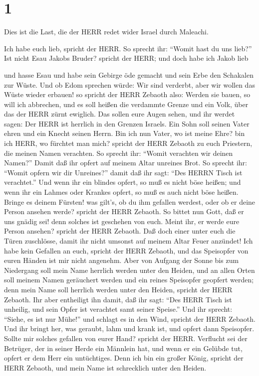 \hypertarget{section}{%
\section{1}\label{section}}

 Dies ist die Last, die der HERR redet wider Israel durch
Maleachi.

 Ich habe euch lieb, spricht der HERR. So sprecht ihr:
``Womit hast du uns lieb?'' Ist nicht Esau Jakobs Bruder? spricht der
HERR; und doch habe ich Jakob lieb

 und hasse Esau und habe sein Gebirge öde gemacht und sein
Erbe den Schakalen zur Wüste.  Und ob Edom sprechen würde:
Wir sind verderbt, aber wir wollen das Wüste wieder erbauen! so spricht
der HERR Zebaoth also: Werden sie bauen, so will ich abbrechen, und es
soll heißen die verdammte Grenze und ein Volk, über das der HERR zürnt
ewiglich.  Das sollen eure Augen sehen, und ihr werdet
sagen: Der HERR ist herrlich in den Grenzen Israels.  Ein
Sohn soll seinen Vater ehren und ein Knecht seinen Herrn. Bin ich nun
Vater, wo ist meine Ehre? bin ich HERR, wo fürchtet man mich? spricht
der HERR Zebaoth zu euch Priestern, die meinen Namen verachten. So
sprecht ihr: ``Womit verachten wir deinen Namen?''  Damit
daß ihr opfert auf meinem Altar unreines Brot. So sprecht ihr: ``Womit
opfern wir dir Unreines?'' damit daß ihr sagt: ``Des HERRN Tisch ist
verachtet.''  Und wenn ihr ein blindes opfert, so muß es
nicht böse heißen; und wenn ihr ein Lahmes oder Krankes opfert, so muß
es auch nicht böse heißen. Bringe es deinem Fürsten! was gilt's, ob du
ihm gefallen werdest, oder ob er deine Person ansehen werde? spricht der
HERR Zebaoth.  So bittet nun Gott, daß er uns gnädig sei!
denn solches ist geschehen von euch. Meint ihr, er werde eure Person
ansehen? spricht der HERR Zebaoth.  Daß doch einer unter
euch die Türen zuschlösse, damit ihr nicht umsonst auf meinem Altar
Feuer anzündet! Ich habe kein Gefallen an euch, spricht der HERR
Zebaoth, und das Speisopfer von euren Händen ist mir nicht angenehm.
 Aber von Aufgang der Sonne bis zum Niedergang soll mein
Name herrlich werden unter den Heiden, und an allen Orten soll meinem
Namen geräuchert werden und ein reines Speisopfer geopfert werden; denn
mein Name soll herrlich werden unter den Heiden, spricht der HERR
Zebaoth.  Ihr aber entheiligt ihn damit, daß ihr sagt:
``Des HERR Tisch ist unheilig, und sein Opfer ist verachtet samt seiner
Speise.''  Und ihr sprecht: ``Siehe, es ist nur Mühe!'' und
schlagt es in den Wind, spricht der HERR Zebaoth. Und ihr bringt her,
was geraubt, lahm und krank ist, und opfert dann Speisopfer. Sollte mir
solches gefallen von eurer Hand? spricht der HERR. 
Verflucht sei der Betrüger, der in seiner Herde ein Männlein hat, und
wenn er ein Gelübde tut, opfert er dem Herr ein untüchtiges. Denn ich
bin ein großer König, spricht der HERR Zebaoth, und mein Name ist
schrecklich unter den Heiden.

